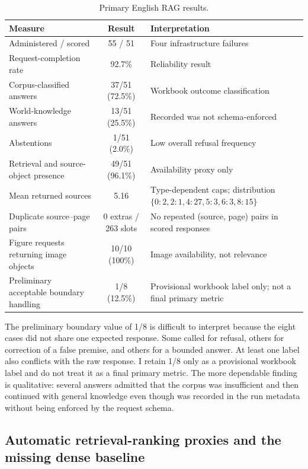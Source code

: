 \begin{table}[htbp]
  \centering
  \caption{Primary English RAG results.}
  \label{tab:english-rag-summary}
  \small
  \begin{tabularx}{\textwidth}{L{0.39\textwidth}C Y}
    \toprule
    Measure & Result & Interpretation \\
    \midrule
    Administered / scored & 55 / 51 & Four infrastructure failures \\
    Request-completion rate & 92.7\% & Reliability result \\
    Corpus-classified answers & 37/51 (72.5\%) & Workbook outcome classification \\
    World-knowledge answers & 13/51 (25.5\%) & Recorded  was not schema-enforced \\
    Abstentions & 1/51 (2.0\%) & Low overall refusal frequency \\
    Retrieval and source-object presence & 49/51 (96.1\%) & Availability proxy only \\
    Mean returned sources & 5.16 & Type-dependent caps; distribution $\{0{:}2,2{:}1,4{:}27,5{:}3,6{:}3,8{:}15\}$ \\
    Duplicate source--page pairs & 0 extras / 263 slots & No repeated (source, page) pairs in scored responses \\
    Figure requests returning image objects & 10/10 (100\%) & Image availability, not relevance \\
    Preliminary acceptable boundary handling & 1/8 (12.5\%) & Provisional workbook label only; not a final primary metric \\
    \bottomrule
  \end{tabularx}
\end{table}

The preliminary boundary value of 1/8 is difficult to interpret because the eight cases did not share one expected response. Some called for refusal, others for correction of a false premise, and others for a bounded answer. At least one label also conflicts with the raw response. I retain 1/8 only as a provisional workbook label and do not treat it as a final primary metric. The more dependable finding is qualitative: several answers admitted that the corpus was insufficient and then continued with general knowledge even though  was recorded in the run metadata without being enforced by the request schema.

\subsection{Automatic retrieval-ranking proxies and the missing dense baseline}
\label{subsec:retrieval-proxy}

